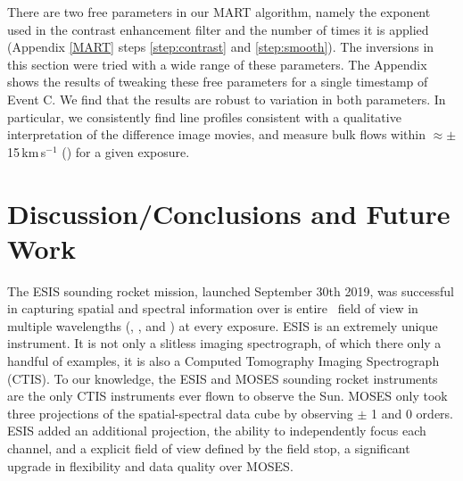 	    		   	
        There are two free parameters in our MART algorithm, namely the exponent used in the contrast enhancement filter and the number of times it is applied (Appendix \ref{MART} steps \ref{step:contrast} and \ref{step:smooth}). The inversions in this section were tried with a wide range of these parameters. The Appendix shows the results of tweaking these free parameters for a single timestamp of Event C.
        We find that the results are robust to variation in both parameters. In particular, we consistently find line profiles consistent with a qualitative interpretation of the difference image movies, and measure bulk flows within $\approx\pm$ 15\,km\,s$^{-1}$ () for a given exposure. 
    	
\section{Discussion/Conclusions and Future Work}
	The ESIS sounding rocket mission, launched September 30th 2019, was successful in capturing spatial and spectral information over is entire \esisfov \ field of view in multiple wavelengths (\hei, \mgxbright, and \ov) at every exposure.
	ESIS is an extremely unique instrument.  It is not only a slitless imaging spectrograph, of which there only a handful of examples, it is also a Computed Tomography Imaging Spectrograph (CTIS).  
	To our knowledge, the ESIS and MOSES sounding rocket instruments are the only CTIS instruments ever flown to observe the Sun. 
	MOSES only took three projections of the spatial-spectral data cube by observing $\pm$ 1 and 0 orders.
	ESIS added an additional projection, the ability to independently focus each channel, and a explicit field of view defined by the field stop, a significant upgrade in flexibility and data quality over MOSES.
	

